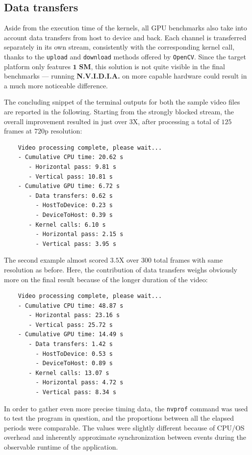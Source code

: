 \documentclass{article}
\begin{document}
\subsection{Data transfers}
Aside from the execution time of the kernels, all GPU benchmarks also take into account data transfers from host to device and back. Each channel is transferred separately in its own stream, consistently with the corresponding kernel call, thanks to the \texttt{upload} and \texttt{download} methods offered by \texttt{OpenCV}. Since the target platform only features $\mathbf{1}$ \textbf{SM}, this solution is not quite visible in the final benchmarks --- running \textsf{\textbf{N.V.I.D.I.A.}} on more capable hardware could result in a much more noticeable difference.

The concluding snippet of the terminal outputs for both the sample video files are reported in the following. Starting from the strongly blocked stream, the overall improvement resulted in just over $3$X, after processing a total of $125$ frames at $720$p resolution:
\begin{verbatim}
    Video processing complete, please wait...
    - Cumulative CPU time: 20.62 s
       - Horizontal pass: 9.81 s
       - Vertical pass: 10.81 s
    - Cumulative GPU time: 6.72 s
       - Data transfers: 0.62 s
         - HostToDevice: 0.23 s
         - DeviceToHost: 0.39 s
       - Kernel calls: 6.10 s
         - Horizontal pass: 2.15 s
         - Vertical pass: 3.95 s
\end{verbatim}

The second example almost scored $3.5$X over $300$ total frames with same resolution as before. Here, the contribution of data transfers weighs obviously more on the final result because of the longer duration of the video:
\begin{verbatim}
    Video processing complete, please wait...
    - Cumulative CPU time: 48.87 s
       - Horizontal pass: 23.16 s
       - Vertical pass: 25.72 s
    - Cumulative GPU time: 14.49 s
       - Data transfers: 1.42 s
         - HostToDevice: 0.53 s
         - DeviceToHost: 0.89 s
       - Kernel calls: 13.07 s
         - Horizontal pass: 4.72 s
         - Vertical pass: 8.34 s
\end{verbatim}

In order to gather even more precise timing data, the \texttt{nvprof} command was used to test the program in question, and the proportions between all the elapsed periods were comparable. The values were slightly different because of CPU/OS overhead and inherently approximate synchronization between events during the observable runtime of the application.
\end{document}
